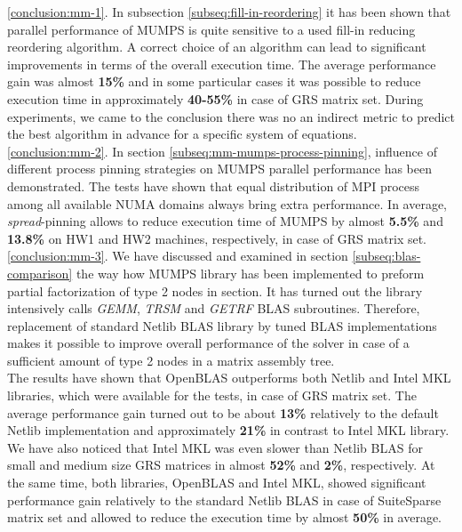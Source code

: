 \ref{conclusion:mm-1}. In subsection \ref{subseq:fill-in-reordering} it has been shown that parallel performance of MUMPS is quite sensitive to a used fill-in reducing reordering algorithm. A correct choice of an algorithm can lead to significant improvements in terms of the overall execution time. The average performance gain was almost \textbf{15\%} and in some particular cases it was possible to reduce execution time in approximately \textbf{40-55\%} in case of GRS matrix set. During experiments, we came to the conclusion there was no an indirect metric to predict the best algorithm in advance for a specific system of equations.\\


\ref{conclusion:mm-2}. In section \ref{subseq:mm-mumps-process-pinning}, influence of different process pinning strategies on MUMPS parallel performance has been demonstrated. The tests have shown that equal distribution of MPI process among all available NUMA domains always bring extra performance. In average, \textit{spread}-pinning allows to reduce execution time of MUMPS by almost \textbf{5.5\%} and \textbf{13.8\%} on HW1 and HW2 machines, respectively, in case of GRS matrix set.\\


\ref{conclusion:mm-3}. 
We have discussed and examined in section \ref{subseq:blas-comparison} the way how MUMPS library has been implemented to preform partial factorization of type 2 nodes in section. It has turned out the library intensively calls \textit{GEMM}, \textit{TRSM} and \textit{GETRF} BLAS subroutines. Therefore, replacement of standard Netlib BLAS library by tuned BLAS implementations makes it possible to improve overall performance of the solver in case of a sufficient amount of type 2 nodes in a matrix assembly tree.\\


The results have shown that OpenBLAS outperforms both Netlib and Intel MKL libraries, which were available for the tests, in case of GRS matrix set. The average performance gain turned out to be about \textbf{13\%} relatively to the default Netlib implementation and approximately \textbf{21\%} in contrast to Intel MKL library. We have also noticed that Intel MKL was even slower than Netlib BLAS for small and medium size GRS matrices in almost \textbf{52\%} and \textbf{2\%}, respectively. At the same time, both libraries, OpenBLAS and Intel MKL, showed significant performance gain relatively to the standard Netlib BLAS in case of SuiteSparse matrix set and allowed to reduce the execution time by almost \textbf{50\%} in average. \\


